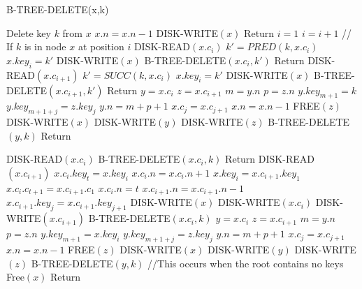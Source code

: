 \documentclass{article}
\begin{document}
\begin{algorithm}
\caption{B-TREE-DELETE(x,k)}
\begin{algorithmic}[1]
			\STATE Delete key $k$ from $x$
			\STATE $x.n = x.n - 1$
			\STATE DISK-WRITE$(x)$
			\STATE Return
		\ENDIF
	\ENDFOR
\ENDIF
\STATE $i = 1$
	\STATE $i = i + 1$
\ENDWHILE
{} // If $k$ is in node $x$ at position $i$
	\STATE DISK-READ$(x.c_i)$
		\STATE $k' = PRED(k,x.c_i)$
		\STATE $x.key_i = k'$
		\STATE DISK-WRITE$(x)$
		\STATE B-TREE-DELETE$(x.c_i, k')$
		\STATE Return
	\STATE DISK-READ$(x.c_{i+1})$
	\ENDIF
		\STATE $k' = SUCC(k,x.c_i)$
		\STATE $x.key_i = k'$
		\STATE DISK-WRITE$(x)$
		\STATE B-TREE-DELETE$(x.c_{i+1}, k')$
		\STATE Return
	\Else
		\STATE $y = x.c_i$
		\STATE $z = x.c_{i+1}$
		\STATE $m = y.n$
		\STATE $p = z.n$
		\STATE $y.key_{m+1} = k$
			\STATE $y.key_{m+1+j} = z.key_j$
		\ENDFOR
		\STATE $y.n = m+p+1$
			\STATE $x.c_j = x.c_{j+1}$
		\ENDFOR
		\STATE $x.n = x.n - 1$
		\STATE FREE$(z)$
		\STATE DISK-WRITE$(x)$
		\STATE DISK-WRITE$(y)$
		\STATE DISK-WRITE$(z)$
		\STATE B-TREE-DELETE$(y,k)$
		\STATE Return
	\ENDIF
\ENDIF
{}
\end{algorithmic}
\end{algorithm}
\begin{algorithm}                     
\begin{algorithmic} [1]                  
\STATE DISK-READ$(x.c_i)$
	\STATE B-TREE-DELETE$(x.c_i,k)$
	\STATE Return
\STATE DISK-READ$(x.c_{i+1})$
	\STATE $x.c_i.key_t = x.key_i$
	\STATE $x.c_i.n = x.c_i.n + 1$
	\STATE $x.key_i = x.c_{i+1}.key_1$
	\STATE $x.c_i.c_{t+1} = x.c_{i+1}.c_1$
	\STATE $x.c_i.n = t$
	\STATE $x.c_{i+1}.n = x.c_{i+1}.n - 1$
		\STATE $x.c_{i+1}.key_j = x.c_{i+1}.key_{j+1}$
	\ENDFOR
	\STATE DISK-WRITE$(x)$
	\STATE DISK-WRITE$(x.c_i)$
	\STATE DISK-WRITE$(x.c_{i+1})$
	\STATE B-TREE-DELETE$(x.c_i, k)$
\Else
	\STATE $y = x.c_i$
	\STATE $z = x.c_{i+1}$
	\STATE $m = y.n$
	\STATE $p = z.n$
	\STATE $y.key_{m+1} = x.key_i$
		\STATE $y.key_{m+1+j} = z.key_j$
	\ENDFOR
	\STATE $y.n = m+p+1$
		\STATE $x.c_j = x.c_{j+1}$
	\ENDFOR
	\STATE $x.n = x.n - 1$
	\STATE FREE$(z)$
	\STATE DISK-WRITE$(x)$
	\STATE DISK-WRITE$(y)$
	\STATE DISK-WRITE$(z)$
	\STATE B-TREE-DELETE$(y,k)$
	 //This occurs when the root contains no keys
		\STATE Free$(x)$
	\ENDIF
	\STATE Return	
\ENDIF
\end{algorithmic}
\end{algorithm}
\end{document}
